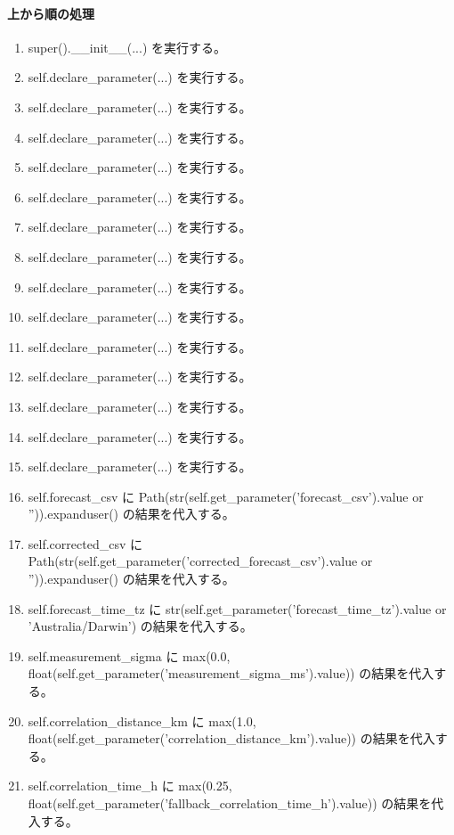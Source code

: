 \documentclass[a4paper,11pt]{article}
\begin{document}
            \paragraph{上から順の処理}
            \begin{enumerate}[leftmargin=1.8em]
            \item super().\_\_init\_\_(...) を実行する。
\item self.declare\_parameter(...) を実行する。
\item self.declare\_parameter(...) を実行する。
\item self.declare\_parameter(...) を実行する。
\item self.declare\_parameter(...) を実行する。
\item self.declare\_parameter(...) を実行する。
\item self.declare\_parameter(...) を実行する。
\item self.declare\_parameter(...) を実行する。
\item self.declare\_parameter(...) を実行する。
\item self.declare\_parameter(...) を実行する。
\item self.declare\_parameter(...) を実行する。
\item self.declare\_parameter(...) を実行する。
\item self.declare\_parameter(...) を実行する。
\item self.declare\_parameter(...) を実行する。
\item self.declare\_parameter(...) を実行する。
\item self.forecast\_csv に Path(str(self.get\_parameter('forecast\_csv').value or '')).expanduser() の結果を代入する。
\item self.corrected\_csv に Path(str(self.get\_parameter('corrected\_forecast\_csv').value or '')).expanduser() の結果を代入する。
\item self.forecast\_time\_tz に str(self.get\_parameter('forecast\_time\_tz').value or 'Australia/Darwin') の結果を代入する。
\item self.measurement\_sigma に max(0.0, float(self.get\_parameter('measurement\_sigma\_ms').value)) の結果を代入する。
\item self.correlation\_distance\_km に max(1.0, float(self.get\_parameter('correlation\_distance\_km').value)) の結果を代入する。
\item self.correlation\_time\_h に max(0.25, float(self.get\_parameter('fallback\_correlation\_time\_h').value)) の結果を代入する。

\end{enumerate}
\end{document}
